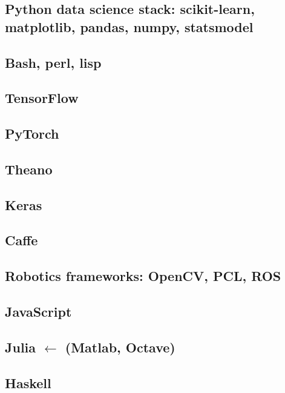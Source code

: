 %
%


\subsection{Python data science stack: scikit-learn, matplotlib, pandas,
              numpy, statsmodel}

\subsection{Bash, perl, lisp}

\subsection{TensorFlow}

\subsection{PyTorch}

\subsection{Theano}

\subsection{Keras}

\subsection{Caffe}

\subsection{Robotics frameworks: OpenCV, PCL, ROS}

\subsection{JavaScript}

\subsection{Julia $\leftarrow$ (Matlab, Octave)}

\subsection{Haskell}

